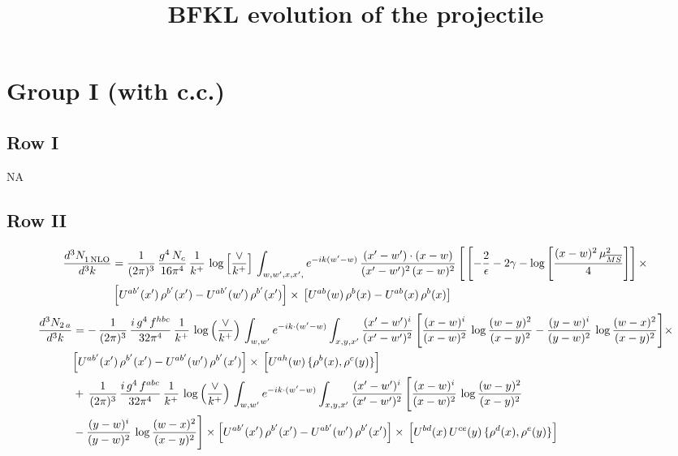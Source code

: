 \documentclass[9pt]{article}
\title{BFKL evolution of the projectile}
\author{}
\date{}
\numberwithin{equation}{section}
\begin{document}
\maketitle
\section{Group I (with c.c.)}
\subsection{Row I}
\textsc{NA}
\subsection{Row II}
\begin{align}
     \frac{d^{3}N_{1\,\rm NLO}^{\rm}}{d^{3}k} &  = \frac{1}{(2\pi)^{3}}\, \frac{g^{4}\,N_{c}}{16\pi^{4}}\,\frac{1}{k^{+}}\,\log{\left[\frac{\vee}{k^{+}}\right]}\, \int_{w, w',x,x',} e^{-ik(w^\prime-w)}\, \frac{(x'-w')\cdot (x-w)}{(x'-w')^{2}\, (x-w)^{2}}\, \Bigg[\left[-\frac{2}{\epsilon}-2\gamma-\log{\left[\frac{(x-w)^{2}\,\mu^{2}_{\overline{MS}}}{4}\right]}\right]\times\notag \\ &  \left[U^{ab'}(x')\,\rho^{b'}(x') - U^{ab'}(w')\,\rho^{b'}(x')\right]\times\,\left[U^{ab}(w)\,\rho^{b}(x) - U^{ab}(x)\,\rho^{b}(x)\right]
\end{align}
\begin{align}
    \frac{d^{3}N_{2\,a}}{d^{3}k} & =  -\,\frac{1}{(2\pi)^{3}}\,\frac{i\,g^{4}\,f^{hbc}}{32\pi^{4}}\,\frac{1}{k^{+}}\,\log\left(\frac{\vee}{k^{+}}\right)\,
\int_{w,w'} e^{-ik\cdot(w'-w)}\int_{x,y,x'}\frac{(x'-w')^{i}}{(x'-w')^{2}}\,\Bigg[\frac{(x-w)^{i}}{(x-w)^{2}}\,\log\frac{(w-y)^{2}}{(x-y)^{2}}-\frac{(y-w)^{i}}{(y-w)^{2}}\,\log\frac{(w-x)^{2}}{(x-y)^{2}}\Bigg]\times\notag \\ & \Big[U^{ab'}(x')\,\rho^{b'}(x')-U^{ab'}(w')\,\rho^{b'}(x')\Big]\times\, \Big[U^{ah}(w)\,\{\rho^{b}(x),\rho^{c}(y)\}\Big]\notag \\ & +\,\frac{1}{(2\pi)^{3}}\,\frac{i\,g^{4}\,f^{abc}}{32\pi^{4}}\,\frac{1}{k^{+}}\, \log\left(\frac{\vee}{k^{+}}\right)\,
\int_{w,w'} e^{-ik\cdot(w'-w)}\int_{x,y,x'}\frac{(x'-w')^{i}}{(x'-w')^{2}}\,\Bigg[\frac{(x-w)^{i}}{(x-w)^{2}}\,\log\frac{(w-y)^{2}}{(x-y)^{2}}\notag \\ & -\frac{(y-w)^{i}}{(y-w)^{2}}\,\log\frac{(w-x)^{2}}{(x-y)^{2}}\Bigg]\times \Big[U^{ab'}(x')\,\rho^{b'}(x')-U^{ab'}(w')\,\rho^{b'}(x')\Big]\times\, \Big[U^{bd}(x)\,U^{ce}(y)\,\{\rho^{d}(x),\rho^{e}(y)\}\Big]
\end{align}
\end{document}

